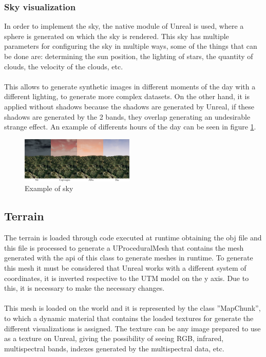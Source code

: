 \documentclass[10pt,a4paper,twocolumn,twoside]{article}
\begin{document}
\subsubsection{Sky visualization}
In order to implement the sky, the native module of Unreal is used, where a sphere is generated on which the sky is rendered. This sky has multiple parameters for configuring the sky in multiple ways, some of the things that can be done are: determining the sun position, the lighting of stars, the quantity of clouds, the velocity of the clouds, etc.
\\\\
This allows to generate synthetic images in different moments of the day with a different lighting, to generate more complex datasets. On the other hand, it is applied without shadows because the shadows are generated by Unreal, if these shadows are generated by the 2 bands, they overlap generating an undesirable strange effect. An example of differents hours of the day can be seen in figure \ref{fig-sky}.

\begin{figure}[!h]
\centering
  	\includegraphics[width=0.48\textwidth]{sky/sky}
	\caption{Example of sky}
	\label{fig-sky}
\end{figure}

\subsection{Terrain}
The terrain is loaded through code executed at runtime obtaining the obj file and this file is processed to generate a UProceduralMesh\cite{uprocedural} that contains the mesh generated with the api of this class to generate meshes in runtime. To generate this mesh it must be considered that Unreal works with a different system of coordinates, it is inverted respective to the UTM model on the y axis. Due to this, it is necessary to make the necessary changes.
\\
\\
This mesh is loaded on the world and it is represented by the class ''MapChunk'', to which a dynamic material that contains the loaded textures for generate the different visualizations is assigned. The texture can be any image prepared to use as a texture on Unreal, giving the possibility of seeing RGB, infrared, multispectral bands, indexes generated by the multispectral data, etc.
\end{document}
